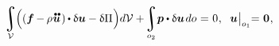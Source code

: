 \nopagebreak\vspace{-0.2em}
\begin{equation}\label{lineartheory:principleofvirtualwork}
\displaystyle\integral\displaylimits_{\mathcal{V}}
\hspace{-0.2ex} \Bigl(
    \left(
        \bm{f}
        \hspace{-0.1ex} - \hspace{-0.1ex}
        \rho \hspace{.1ex}
        \mathdotdotabove{\bm{u}}
        \hspace{.2ex}
    \right)
    \hspace{-0.1ex}
    \dotp
    \variation{\bm{u}} - \variation{\potentialenergydensity}
\hspace{.1ex} \Bigr) d\mathcal{V}
+ \hspace{-0.3ex}
\displaystyle\integral\displaylimits_{o_2} \hspace{-0.4ex} \bm{p} \dotp \variation{\bm{u}} \hspace{.25ex} do \hspace{.1ex}
= \hspace{.1ex} 0
\hspace{.1ex} ,
\hspace{.6em}
%
\bm{u} \hspace{.1ex}
\bigr|_{o_1}
\hspace{-0.64ex} = \hspace{.1ex}
\zerovector
\hspace{.1ex} ,
\vspace{-0.2em}
\end{equation}

\noindent\vspace{-0.2em}

